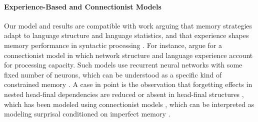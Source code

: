 \paragraph{Experience-Based and Connectionist Models}
Our model and results are compatible with work arguing that memory strategies adapt to language structure and language statistics, and that experience shapes memory performance in syntactic processing \citep[e.g.][]{macdonald2002reassessing,wells2009experience}.
For instance, \citet{macdonald2002reassessing} argue for a connectionist model in which network structure and language experience account for processing capacity.
Such models use recurrent neural networks with some fixed number of neurons, which can be understood as a specific kind of constrained memory \citep{futrell2020lossy}.
A case in point is the observation that forgetting effects in nested head-final dependencies are reduced or absent in  head-final structures \citep{vasishth2010short,frank2016cross,frank2019judgements}, which has been modeled using connectionist models \citep{engelmann2009processing,frank-cross-linguistic-2015}, which can be interpreted as modeling surprisal conditioned on imperfect memory \citep{futrell2020lossy}.







